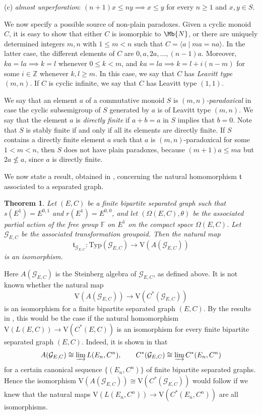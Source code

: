 \documentclass[11pt]{amsart}
\def\N{\mathbb{N}}
\theoremstyle{plain}            %
\newtheorem{theorem}{Theorem}[section]
\theoremstyle{definition}       %
\theoremstyle{definition}       %
\theoremstyle{remark}
\newcommand{\V}{\mathrm{V}}
\newcommand{\Typ}{\mathrm{Typ}}
\def\Z{\mathbb{Z}}
\def\N{\mathbb{N}}
\def\N{\Mb{N}}
\newcommand{\F}{\mathbb F}
\def\N{\Mb{N}}
\begin{document}
\smallskip

(c) {\it almost unperforation}: $(n+1)x\le ny \implies  x\le y$ for
every $n\ge 1$ and $x,y\in S$.

We now specify a possible source of non-plain paradoxes.
Given a cyclic monoid $C$,  it is easy to show that either $C$ is isomorphic to $\N$, or
there are uniquely determined
integers $m,n$ with $1\le m< n$ such that $C= \langle a \mid ma=na \rangle$. 
In the latter case, the different elements of $C$ are $0,a,2a,\dots , (n-1)a$.
Moreover, $ka=la\implies k=l$ whenever $0\le k <m$, and $ka=la\implies k=l+i(n-m)$ for some $i\in \Z$ whenever $k,l\ge m$.  In this case, we say that $C$ has {\it Leavitt type} $(m,n)$. If $C$ is cyclic infinite, we say that $C$ has Leavitt type $(1,1)$. 


We say that an element $a$ of a commutative monoid $S$ is {\it $(m,n)$-paradoxical} in case the cyclic subsemigroup of $S$ generated by $a$ is of Leavitt type $(m,n)$. 
We say that the element $a$ is {\it directly finite} if $a+b= a$ in $S$ implies that $b=0$. Note that $S$ is stably finite if and only if all its elements are directly finite. 
If $S$ contains a directly finite element $a$ such that $a$ is $(m,n)$-paradoxical for some $1<m<n$, then $S$ does not have plain paradoxes, because $(m+1) a\le ma$ but $2a\nleq a$, since $a$ is directly finite.  

We now state a result, obtained in \cite{ae14}, concerning the natural homomorphism $\mathfrak{t}$ associated to a separated graph. 

\begin{theorem}
	\label{thm:typesemigroupforOmegaEC} Let $(E,C)$ be a finite
	bipartite separated graph such that $s(E^1)=E^{0,1}$ and
	$r(E^1)=E^{0,0}$, and let $(\Omega (E,C),\theta)$ be the associated partial action
	of the free group $\F$ on $E^1$ on the compact space $\Omega (E,C)$. Let $\mathcal G_{E,C}$ be the associated transformation groupoid.  
	Then the natural map
	$$\mathfrak{t}_{\mathcal G_{E,C}} \colon \Typ (\mathcal G_{E,C}) \longrightarrow \V (A (\mathcal G_{E,C}))$$ is an isomorphism. 
\end{theorem}

Here $A(\mathcal G_{E,C} )$ is the Steinberg algebra of $\mathcal G_{E,C}$, as defined above. 
It is not known whether the natural map 
$$\V (A(\mathcal G_{E,C} ) )\longrightarrow \V (C^*(\mathcal G_{E,C} ) )$$
is an isomorphism for a finite bipartite separated graph $(E,C)$. By the results in \cite{ae14}, this would be the case if the natural 
homomorphism $\V (L(E,C)) \longrightarrow \V (C^*(E,C))$ is an isomorphism for every finite bipartite separated graph $(E,C)$.
Indeed, it is shown in \cite[Section 5]{ae14} that 
\begin{equation}
\label{eq:AG-is-a direct-limit}
A(\mathcal G_{E,C})\cong \varinjlim L(E_n,C^n),\qquad C^*(\mathcal G_{E,C}) \cong \varinjlim C^*(E_n,C^n)
\end{equation}
for a certain canonical sequence $\{(E_n,C^n)\}$ of finite bipartite separated graphs. Hence the isomorphism
$\V(A(\mathcal G _{E,C})) \cong \V (C^* (\mathcal G _{E,C}))$ would follow if we knew that the natural maps 
$\V (L(E_n,C^n)) \longrightarrow \V (C^*(E_n,C^n))$ are all isomorphisms. 
\end{document}

